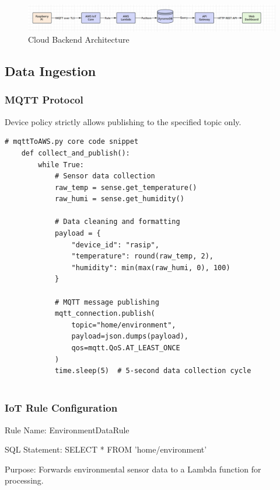 \documentclass[12pt,a4paper]{article}
\begin{document}
\begin{figure}[h!]
    \centering
    \includegraphics[width=0.95\linewidth]{figures/cloudBackendStructure.png}
    \caption{Cloud Backend  Architecture}
\end{figure}


\subsection{Data Ingestion}

\subsubsection{MQTT Protocol}
Device policy strictly allows publishing to the specified topic only.

\begin{lstlisting}[style=classicpython,caption={mqttToAWS.py snippet},captionpos=b]
    # mqttToAWS.py core code snippet
    def collect_and_publish():
        while True:
            # Sensor data collection
            raw_temp = sense.get_temperature()  
            raw_humi = sense.get_humidity()
            
            # Data cleaning and formatting
            payload = {
                "device_id": "rasip",              
                "temperature": round(raw_temp, 2), 
                "humidity": min(max(raw_humi, 0), 100)  
            }
            
            # MQTT message publishing
            mqtt_connection.publish(
                topic="home/environment",
                payload=json.dumps(payload),
                qos=mqtt.QoS.AT_LEAST_ONCE
            )
            time.sleep(5)  # 5-second data collection cycle
   
        \end{lstlisting}
    

\subsubsection{IoT Rule Configuration}
Rule Name: EnvironmentDataRule

\noindent
SQL Statement: SELECT * FROM 'home/environment'

\noindent
Purpose: Forwards environmental sensor data to a Lambda function for processing.
\end{document}
